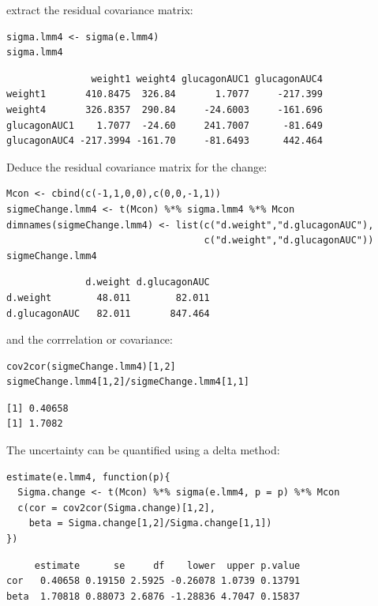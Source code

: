 \documentclass[12pt]{article}
\begin{document}
extract the residual covariance matrix:
\lstset{language=r,label= ,caption= ,captionpos=b,numbers=none}
\begin{lstlisting}
sigma.lmm4 <- sigma(e.lmm4)
sigma.lmm4
\end{lstlisting}

\begin{verbatim}
               weight1 weight4 glucagonAUC1 glucagonAUC4
weight1       410.8475  326.84       1.7077     -217.399
weight4       326.8357  290.84     -24.6003     -161.696
glucagonAUC1    1.7077  -24.60     241.7007      -81.649
glucagonAUC4 -217.3994 -161.70     -81.6493      442.464
\end{verbatim}


Deduce the residual covariance matrix for the change:
\lstset{language=r,label= ,caption= ,captionpos=b,numbers=none}
\begin{lstlisting}
Mcon <- cbind(c(-1,1,0,0),c(0,0,-1,1))
sigmeChange.lmm4 <- t(Mcon) %*% sigma.lmm4 %*% Mcon
dimnames(sigmeChange.lmm4) <- list(c("d.weight","d.glucagonAUC"),
                                   c("d.weight","d.glucagonAUC"))
sigmeChange.lmm4
\end{lstlisting}

\begin{verbatim}
              d.weight d.glucagonAUC
d.weight        48.011        82.011
d.glucagonAUC   82.011       847.464
\end{verbatim}


and the corrrelation or covariance:
\lstset{language=r,label= ,caption= ,captionpos=b,numbers=none}
\begin{lstlisting}
cov2cor(sigmeChange.lmm4)[1,2]
sigmeChange.lmm4[1,2]/sigmeChange.lmm4[1,1]
\end{lstlisting}

\begin{verbatim}
[1] 0.40658
[1] 1.7082
\end{verbatim}


The uncertainty can be quantified using a delta method:
\lstset{language=r,label= ,caption= ,captionpos=b,numbers=none}
\begin{lstlisting}
estimate(e.lmm4, function(p){
  Sigma.change <- t(Mcon) %*% sigma(e.lmm4, p = p) %*% Mcon
  c(cor = cov2cor(Sigma.change)[1,2],
    beta = Sigma.change[1,2]/Sigma.change[1,1])
})
\end{lstlisting}

\begin{verbatim}
     estimate      se     df    lower  upper p.value
cor   0.40658 0.19150 2.5925 -0.26078 1.0739 0.13791
beta  1.70818 0.88073 2.6876 -1.28836 4.7047 0.15837
\end{verbatim}
\end{document}
